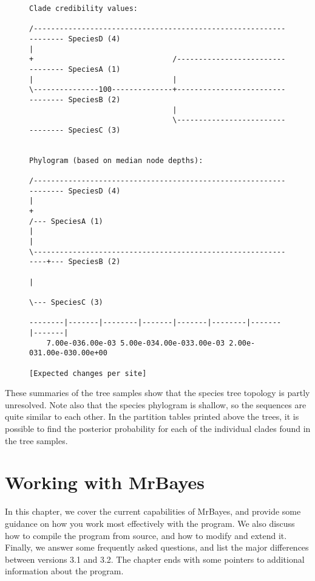 \documentclass[12pt]{book}
\begin{document}
\begin{figure}[h]
\centering
\begin{BVerbatim}[fontsize=\scriptsize]
Clade credibility values:

/------------------------------------------------------------------ SpeciesD (4)
|
+                                /--------------------------------- SpeciesA (1)
|                                |
\---------------100--------------+--------------------------------- SpeciesB (2)
                                 |
                                 \--------------------------------- SpeciesC (3)


Phylogram (based on median node depths):

/------------------------------------------------------------------ SpeciesD (4)
|
+                                                              /--- SpeciesA (1)
|                                                              |
\--------------------------------------------------------------+--- SpeciesB (2)
                                                               |
                                                               \--- SpeciesC (3)

--------|-------|--------|-------|-------|--------|-------|-------|
    7.00e-036.00e-03 5.00e-034.00e-033.00e-03 2.00e-031.00e-030.00e+00

[Expected changes per site]

\end{BVerbatim}
\end{figure}

These summaries of the tree samples show that the species tree topology is partly unresolved. Note
also that the species phylogram is shallow, so the sequences are quite similar to each other. In
the partition tables printed above the trees, it is possible to find the posterior probability for
each of the individual clades found in the tree samples.

\chapter{Working with MrBayes}\label{advancedTopics}

In this chapter, we cover the current capabilities of MrBayes, and provide some guidance on how you
work most effectively with the program. We also discuss how to compile the program from source, and
how to modify and extend it. Finally, we answer some frequently asked questions, and list the major
differences between versions 3.1 and 3.2. The chapter ends with some pointers to additional
information about the program.
\end{document}
